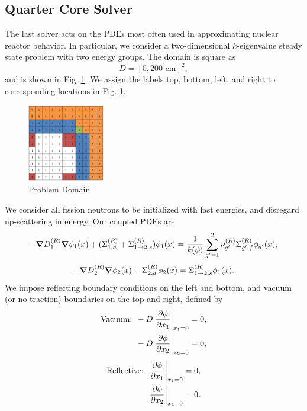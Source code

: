 \subsection{Quarter Core Solver}
The last solver acts on the PDEs most often used in approximating nuclear reactor behavior.  In particular, we consider a two-dimensional $k$-eigenvalue steady state problem with two energy groups.  The domain is square as
\begin{equation}
D=[0,200\text{ cm}]^2,
\end{equation}
and is shown in Fig. \ref{core}.  We assign the labels top, bottom, left, and right to corresponding locations in Fig. \ref{core}.
\begin{figure}[H]
\centering
   \includegraphics[width=0.3\textwidth]{../graphics/core}
   \caption{Problem Domain}
   \label{core}
\end{figure}

We consider all fission neutrons to be initialized with fast energies, and disregard up-scattering in energy.  Our coupled PDEs are
\begin{equation}
-\grad D_1^{(R)}\grad\phi_1(\bar x)+(\Sigma_{1,a}^{(R)}+\Sigma_{1\to2,s}^{(R)})\phi_1(\bar x) = \frac{1}{k(\phi)}\sum_{g'=1}^2\nu_{g'}^{(R)}\Sigma_{g',f}^{(R)}\phi_{g'}(\bar x),
\end{equation}
\begin{equation}
-\grad D_2^{(R)}\grad \phi_2(\bar x)+\Sigma_{2,a}^{(R)}\phi_2(\bar x) = \Sigma_{1\to 2,s}^{(R)}\phi_1(\bar x).
\end{equation}
We impose reflecting boundary conditions on the left and bottom, and vacuum (or no-traction) boundaries on the top and right, defined by
\begin{align}
\text{Vacuum: }&-D\eval{\pdv{\phi}{x_1}}_{x_1=0}=0,\\
&-D\eval{\pdv{\phi}{x_2}}_{x_2=0}=0,
\end{align}
\begin{align}
\text{Reflective: }&\eval{\pdv{\phi}{x_1}}_{x_1=0}=0,\\
&\eval{\pdv{\phi}{x_2}}_{x_2=0}=0.
\end{align}

